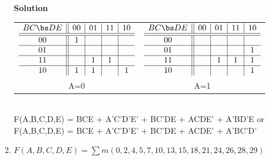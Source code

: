\begin{enumerate}
\begin{enumerate}
                \begin{onlysolution}  \textbf{Solution} \itshape{
                        \begin{tabular}{cc}
                            $
                            \begin{array} {c||c|c|c|c}
                                B C \bs D E   & 00 & 01 & 11 & 10 \\ \hline \hline
                                00        & 1  &    &    &    \\ \hline
                                01        &    &    &    &    \\ \hline
                                11        &    & 1  & 1  &    \\ \hline
                                10        & 1  & 1  &    & 1  \\
                            \end{array}$ &
                            $
                            \begin{array} {c||c|c|c|c}
                                B C \bs D E   & 00 & 01 & 11 & 10 \\ \hline \hline
                                00        &    &    &    &    \\ \hline
                                01        &    &    &    & 1  \\ \hline
                                11        &    & 1  & 1  & 1  \\ \hline
                                10        &    &    &    & 1  \\
                            \end{array}$ \\
                            A=0 & A=1 \\
                        \end{tabular} \\
                        F(A,B,C,D,E) = BCE + A'C'D'E' + BC'DE + ACDE' + A'BD'E or \\
                        F(A,B,C,D,E) = BCE + A'C'D'E' + BC'DE + ACDE' + A'BC'D'
                    }
                \end{onlysolution}

            \item $F(A,B,C,D,E)=\sum m(0,2,4,5,7,10,13,15,18,21,24,26,28,29)$


\end{enumerate}
\end{enumerate}
